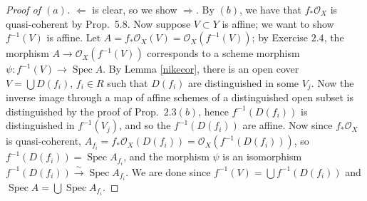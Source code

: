 \documentclass[10pt]{article}
\theoremstyle{definition}
\theoremstyle{remark}
\numberwithin{equation}{section}
\numberwithin{figure}{subsubsection}
\DeclareMathOperator{\Spec}{Spec}
\newcommand{\OO}{\mathcal{O}}
\newcommand{\isoto}{\overset{\sim}{\to}}
\begin{document}
\begin{proof}[Proof of $(a)$]
  $\Leftarrow$ is clear, so we show $\Rightarrow$. By $(b)$, we have that
  $f_*\OO_X$ is quasi-coherent by Prop.~5.8. Now suppose $V \subset Y$ is
  affine; we want to show $f^{-1}(V)$ is affine. Let $A = f_*\OO_X(V) =
  \OO_X(f^{-1}(V))$; by Exercise $2.4$, the morphism $A \to \OO_X(f^{-1}(V))$ corresponds to a scheme morphism $\psi\colon f^{-1}(V) \to \Spec A$. By Lemma \ref{nikecor}, there is an open cover $V = \bigcup D(f_i)$, $f_i \in R$ such that $D(f_i)$ are distinguished in some $V_j$. Now the inverse image through a map of affine schemes of a distinguished open subset is distinguished by the proof of Prop.~$2.3(b)$, hence $f^{-1}(D(f_i))$ is distinguished in $f^{-1}(V_j)$, and so the $f^{-1}(D(f_i))$ are affine. Now since $f_*\OO_X$ is quasi-coherent, $A_{f_i} = f_*\OO_X(D(f_i)) = \OO_X(f^{-1}(D(f_i)))$, so $f^{-1}(D(f_i)) = \Spec A_{f_i}$, and the morphism $\psi$ is an isomorphism $f^{-1}(D(f_i)) \isoto \Spec A_{f_i}$. We are done since $f^{-1}(V) = \bigcup f^{-1}(D(f_i))$ and $\Spec A = \bigcup \Spec A_{f_i}$.
\end{proof}
\end{document}
